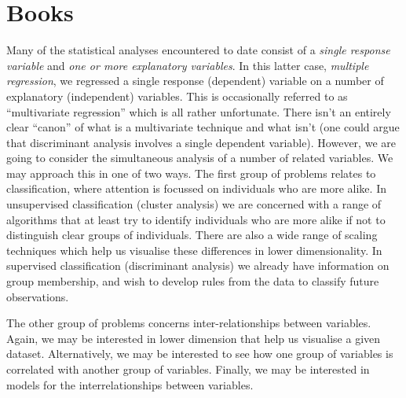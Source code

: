 \chapter*{Books}

Many of the statistical analyses encountered to date consist of a \emph{single response variable} and \emph{one or more explanatory variables}.  In this latter case, \emph{multiple regression}, we regressed a single response (dependent) variable on a number of explanatory (independent) variables.   This is occasionally referred to as ``multivariate regression'' which is all rather unfortunate.   There isn't an entirely clear ``canon'' of what is a multivariate technique and what isn't (one could argue that discriminant analysis involves a single dependent variable).   However, we are going to consider the simultaneous analysis of a number of related variables.   We may approach this in one of two ways.   The first group of problems relates to classification, where attention is focussed on individuals who are more alike.   In unsupervised classification (cluster analysis) we are concerned with a range of algorithms that at least try to identify individuals who are more alike if not to distinguish clear groups of individuals.   There are also a wide range of scaling techniques which help us visualise these differences in lower dimensionality.   In supervised classification (discriminant analysis) we already have information on group membership, and wish to develop rules from the data to classify future observations.  

The other group of problems concerns inter-relationships between variables.   Again, we may be interested in lower dimension that help us visualise a given dataset.   Alternatively, we may be interested to see how one group of variables is correlated with another group of variables.   Finally, we may be interested in models for the interrelationships between variables.






